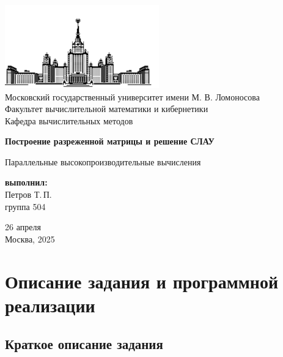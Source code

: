 \documentclass[12pt, a4paper]{article}
\begin{document}
	
\thispagestyle{empty}

\begin{center}
	\ \vspace{-3cm}
	
	\includegraphics[width=0.5\textwidth]{msu-eps-converted-to.pdf}\\
	{Московский государственный университет имени М. В. Ломоносова}\\
	Факультет вычислительной математики и кибернетики\\
	Кафедра вычислительных методов
	
	\vspace{6cm}
	
	{\Large \bfseries Построение разреженной матрицы и решение СЛАУ}
	
	\vspace{1cm}
	
	{\large Параллельные высокопроизводительные вычисления}
\end{center}

\vfill

\begin{flushright}
	\textbf{выполнил:}\\
	Петров Т.\,П. \\
	группа 504
\end{flushright}

\vfill

\begin{center}
	26 апреля \\
	Москва, 2025
\end{center}

\enlargethispage{2\baselineskip}

\newpage

\tableofcontents

\newpage

\section{Описание задания и программной реализации}
\subsection{Краткое описание задания}
\end{document}
